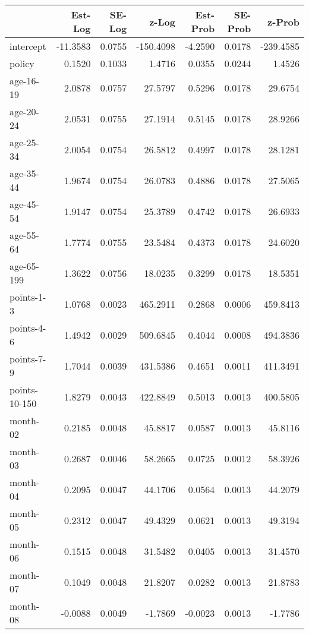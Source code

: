 \documentclass[10pt]{article}
\begin{document}

\begin{table}[ht]
\centering
\begin{tabular}{lrrrrrr}
  \hline
 & Est-Log & SE-Log & z-Log & Est-Prob & SE-Prob & z-Prob \\ 
  \hline
intercept & -11.3583 & 0.0755 & -150.4098 & -4.2590 & 0.0178 & -239.4585 \\ 
  policy & 0.1520 & 0.1033 & 1.4716 & 0.0355 & 0.0244 & 1.4526 \\ 
  age-16-19 & 2.0878 & 0.0757 & 27.5797 & 0.5296 & 0.0178 & 29.6754 \\ 
  age-20-24 & 2.0531 & 0.0755 & 27.1914 & 0.5145 & 0.0178 & 28.9266 \\ 
  age-25-34 & 2.0054 & 0.0754 & 26.5812 & 0.4997 & 0.0178 & 28.1281 \\ 
  age-35-44 & 1.9674 & 0.0754 & 26.0783 & 0.4886 & 0.0178 & 27.5065 \\ 
  age-45-54 & 1.9147 & 0.0754 & 25.3789 & 0.4742 & 0.0178 & 26.6933 \\ 
  age-55-64 & 1.7774 & 0.0755 & 23.5484 & 0.4373 & 0.0178 & 24.6020 \\ 
  age-65-199 & 1.3622 & 0.0756 & 18.0235 & 0.3299 & 0.0178 & 18.5351 \\ 
  points-1-3 & 1.0768 & 0.0023 & 465.2911 & 0.2868 & 0.0006 & 459.8413 \\ 
  points-4-6 & 1.4942 & 0.0029 & 509.6845 & 0.4044 & 0.0008 & 494.3836 \\ 
  points-7-9 & 1.7044 & 0.0039 & 431.5386 & 0.4651 & 0.0011 & 411.3491 \\ 
  points-10-150 & 1.8279 & 0.0043 & 422.8849 & 0.5013 & 0.0013 & 400.5805 \\ 
  month-02 & 0.2185 & 0.0048 & 45.8817 & 0.0587 & 0.0013 & 45.8116 \\ 
  month-03 & 0.2687 & 0.0046 & 58.2665 & 0.0725 & 0.0012 & 58.3926 \\ 
  month-04 & 0.2095 & 0.0047 & 44.1706 & 0.0564 & 0.0013 & 44.2079 \\ 
  month-05 & 0.2312 & 0.0047 & 49.4329 & 0.0621 & 0.0013 & 49.3194 \\ 
  month-06 & 0.1515 & 0.0048 & 31.5482 & 0.0405 & 0.0013 & 31.4570 \\ 
  month-07 & 0.1049 & 0.0048 & 21.8207 & 0.0282 & 0.0013 & 21.8783 \\ 
  month-08 & -0.0088 & 0.0049 & -1.7869 & -0.0023 & 0.0013 & -1.7786 \\ 

\end{tabular}
\end{table}
\end{document}
